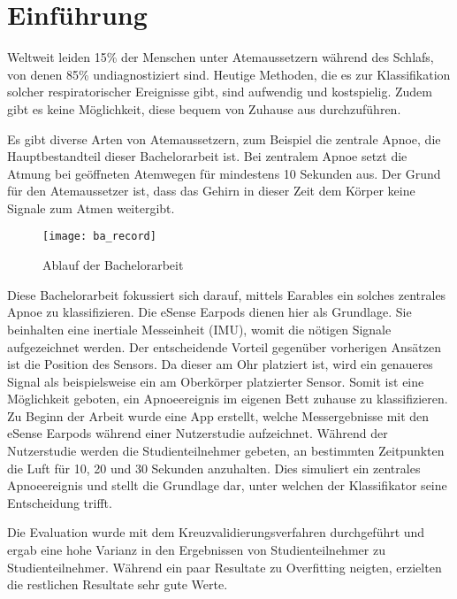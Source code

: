 
\chapter{Einführung}
\label{ch:Introduction}

Weltweit leiden 15\% der Menschen unter Atemaussetzern während des Schlafs, von denen 85\% undiagnostiziert sind.
Heutige Methoden, die es zur Klassifikation solcher respiratorischer Ereignisse gibt, sind aufwendig und kostspielig. 
Zudem gibt es keine Möglichkeit, diese bequem von Zuhause aus durchzuführen.

Es gibt diverse Arten von Atemaussetzern, zum Beispiel die zentrale Apnoe, die Hauptbestandteil dieser Bachelorarbeit ist. 
Bei zentralem Apnoe setzt die Atmung bei geöffneten Atemwegen für mindestens 10 Sekunden aus. 
Der Grund für den Atemaussetzer ist, dass das Gehirn in dieser Zeit dem Körper keine Signale zum Atmen weitergibt.

\begin{figure}[h]
  \centering
  \texttt{[image: ba\_record]}
  \caption{Ablauf der Bachelorarbeit}
  \label{introduction:ba_record}
\end{figure}

Diese Bachelorarbeit fokussiert sich darauf, mittels Earables ein solches zentrales Apnoe zu klassifizieren.
Die eSense Earpods dienen hier als Grundlage.
Sie beinhalten eine inertiale Messeinheit (IMU), womit die nötigen Signale aufgezeichnet werden. 
Der entscheidende Vorteil gegenüber vorherigen Ansätzen ist die Position des Sensors.
Da dieser am Ohr platziert ist, wird ein genaueres Signal als beispielsweise ein am Oberkörper platzierter Sensor.
Somit ist eine Möglichkeit geboten, ein Apnoeereignis im eigenen Bett zuhause zu klassifizieren. 
Zu Beginn der Arbeit wurde eine App erstellt, welche Messergebnisse mit den eSense Earpods während einer Nutzerstudie aufzeichnet.
Während der Nutzerstudie werden die Studienteilnehmer gebeten, an bestimmten Zeitpunkten die Luft für 10, 20 und 30 Sekunden anzuhalten.
Dies simuliert ein zentrales Apnoeereignis und stellt die Grundlage dar, unter welchen der Klassifikator seine Entscheidung trifft.

Die Evaluation wurde mit dem Kreuzvalidierungsverfahren durchgeführt und ergab eine hohe Varianz in den Ergebnissen von Studienteilnehmer zu Studienteilnehmer.
Während ein paar Resultate zu Overfitting neigten, erzielten die restlichen Resultate sehr gute Werte.
